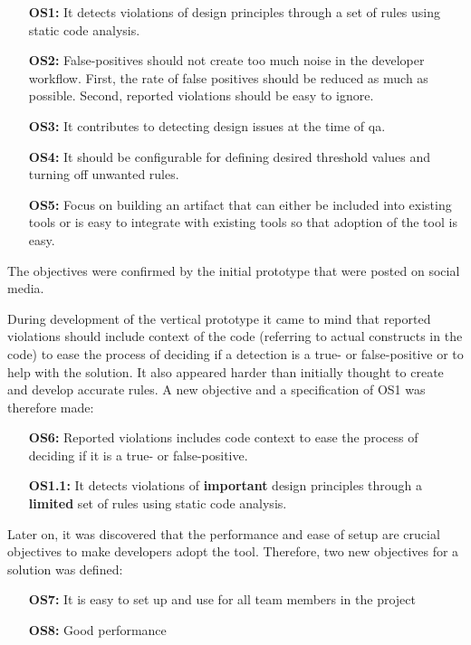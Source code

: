 \documentclass{report}
\begin{document}
\begin{itemize}
    \item [\textbf{OS1:}] It detects violations of design principles through a set of rules using static code analysis.
    \item [\textbf{OS2:}] False-positives should not create too much noise in the developer workflow. First, the rate of false positives should be reduced as much as possible. Second, reported violations should be easy to ignore. 
    \item [\textbf{OS3:}] It contributes to detecting design issues at the time of \gls{qa}.
    \item [\textbf{OS4:}] It should be configurable for defining desired threshold values and turning off unwanted rules.
    \item [\textbf{OS5:}] Focus on building an artifact that can either be included into existing tools or is easy to integrate with existing tools so that adoption of the tool is easy.
\end{itemize}

The objectives were confirmed by the initial prototype that were posted on social media. 



During development of the vertical prototype it came to mind that reported violations should include context of the code (referring to actual constructs in the code) to ease the process of deciding if a detection is a true- or false-positive or to help with the solution. It also appeared harder than initially thought to create and develop accurate rules. A new objective and a specification of OS1 was therefore made: 


\begin{itemize}
    \item [\textbf{OS6:}] Reported violations includes code context to ease the process of deciding if it is a true- or false-positive. 
    \item [\textbf{OS1.1:}] It detects violations of \textbf{important} design principles through a \textbf{limited} set of rules using static code analysis.
\end{itemize}

Later on, it was discovered that the performance and ease of setup are crucial objectives to make developers adopt the tool. Therefore, two new objectives for a solution was defined:
\begin{itemize}
     \item [\textbf{OS7:}] It is easy to set up and use for all team members in the project
    \item [\textbf{OS8:}] Good performance
\end{itemize}
\end{document}
